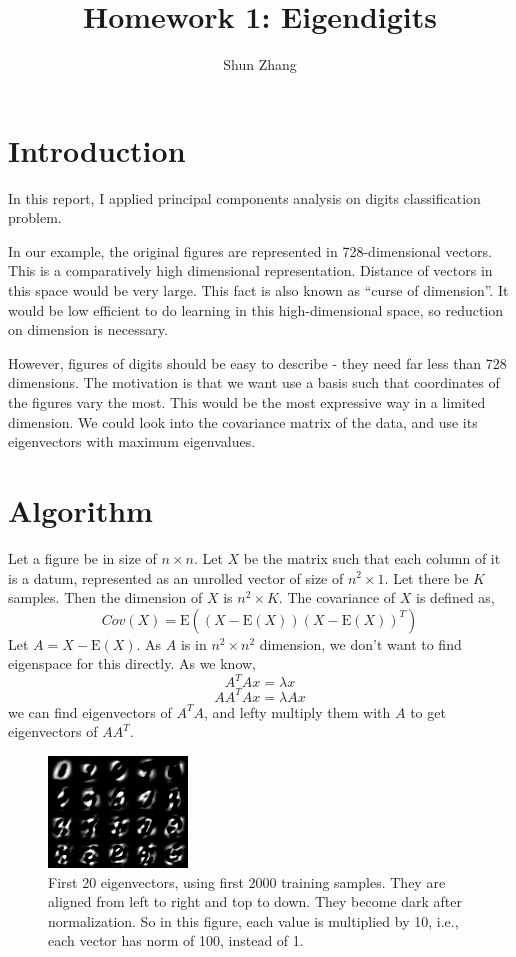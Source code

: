 \documentclass[10pt]{article}
\title{Homework 1: Eigendigits}
\author{Shun Zhang}
\date{}
\begin{document}
\maketitle

\section{Introduction}

In this report, I applied principal components analysis on digits
classification problem.

In our example, the original figures are represented in
728-dimensional vectors. This is a comparatively high dimensional
representation. Distance of vectors in this space would be very large.
This fact is also known as ``curse of dimension''. It would be low
efficient to do learning in this high-dimensional space, so reduction
on dimension is necessary.

However, figures of digits should be easy to describe - they need far
less than 728 dimensions. The motivation is that we want use a basis
such that coordinates of the figures vary the most. This would be the
most expressive way in a limited dimension. We could look into the
covariance matrix of the data, and use its eigenvectors with maximum
eigenvalues.

\section{Algorithm}

Let a figure be in size of $n \times n$. Let $X$ be the matrix such
that each column of it is a datum, represented as an unrolled vector
of size of $n^2 \times 1$. Let there be $K$ samples. Then the
dimension of $X$ is $n^2 \times K$. The covariance of $X$ is defined
as,
$$Cov(X) = \mathrm{E}((X - \mathrm{E}(X))(X - \mathrm{E}(X))^T)$$
Let $A = X - \mathrm{E}(X)$. As $A$ is in $n^2 \times n^2$ dimension,
we don't want to find eigenspace for this directly. As we know,
$$A^TAx = \lambda x$$
$$AA^TAx = \lambda Ax$$
we can find eigenvectors of $A^TA$, and lefty multiply them with $A$
to get eigenvectors of $AA^T$.

\begin{figure}
\centering
\includegraphics[]{eigen.png}
\caption{First 20 eigenvectors, using first 2000 training samples.
They are aligned from left to right and top to down. They become dark
after normalization. So in this figure, each value is multiplied by
10, i.e., each vector has norm of 100, instead of 1. }
\label{fig:eigen}
\end{figure}
\end{document}
